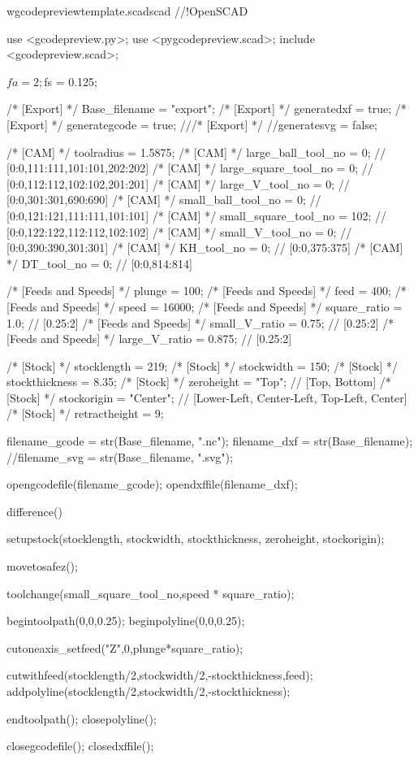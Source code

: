 \documentclass{ltxdoc}
\begin{document}
\lstset{firstnumber=1}%
\begin{writecode}{w}{gcodepreviewtemplate.scad}{scad}
//!OpenSCAD

use <gcodepreview.py>;
use <pygcodepreview.scad>;
include <gcodepreview.scad>;

$fa = 2;
$fs = 0.125;

/* [Export] */
Base_filename = "export"; 
/* [Export] */
generatedxf = true; 
/* [Export] */
generategcode = true; 
///* [Export] */
//generatesvg = false; 

/* [CAM] */
toolradius = 1.5875;
/* [CAM] */
large_ball_tool_no = 0; // [0:0,111:111,101:101,202:202]
/* [CAM] */
large_square_tool_no = 0; // [0:0,112:112,102:102,201:201]
/* [CAM] */
large_V_tool_no = 0; // [0:0,301:301,690:690]
/* [CAM] */
small_ball_tool_no = 0; // [0:0,121:121,111:111,101:101]
/* [CAM] */
small_square_tool_no = 102; // [0:0,122:122,112:112,102:102]
/* [CAM] */
small_V_tool_no = 0; // [0:0,390:390,301:301]
/* [CAM] */
KH_tool_no = 0; // [0:0,375:375]
/* [CAM] */
DT_tool_no = 0; // [0:0,814:814]

/* [Feeds and Speeds] */
plunge = 100;
/* [Feeds and Speeds] */
feed = 400;
/* [Feeds and Speeds] */
speed = 16000;
/* [Feeds and Speeds] */
square_ratio = 1.0; // [0.25:2]
/* [Feeds and Speeds] */
small_V_ratio = 0.75; // [0.25:2]
/* [Feeds and Speeds] */
large_V_ratio = 0.875; // [0.25:2]

/* [Stock] */
stocklength = 219;
/* [Stock] */
stockwidth = 150;
/* [Stock] */
stockthickness = 8.35;
/* [Stock] */
zeroheight = "Top"; // [Top, Bottom]
/* [Stock] */
stockorigin = "Center"; // [Lower-Left, Center-Left, Top-Left, Center]
/* [Stock] */
retractheight = 9;

filename_gcode = str(Base_filename, ".nc");
filename_dxf = str(Base_filename);
//filename_svg = str(Base_filename, ".svg");

opengcodefile(filename_gcode);
opendxffile(filename_dxf);

difference() {
setupstock(stocklength, stockwidth, stockthickness, zeroheight, stockorigin);

movetosafez();

toolchange(small_square_tool_no,speed * square_ratio);

begintoolpath(0,0,0.25);
beginpolyline(0,0,0.25);

cutoneaxis_setfeed("Z",0,plunge*square_ratio);

cutwithfeed(stocklength/2,stockwidth/2,-stockthickness,feed);
addpolyline(stocklength/2,stockwidth/2,-stockthickness);

endtoolpath();
closepolyline();
}

closegcodefile();
closedxffile();
\end{writecode}
\addtocounter{gcptmpl}{112}
\end{document}

